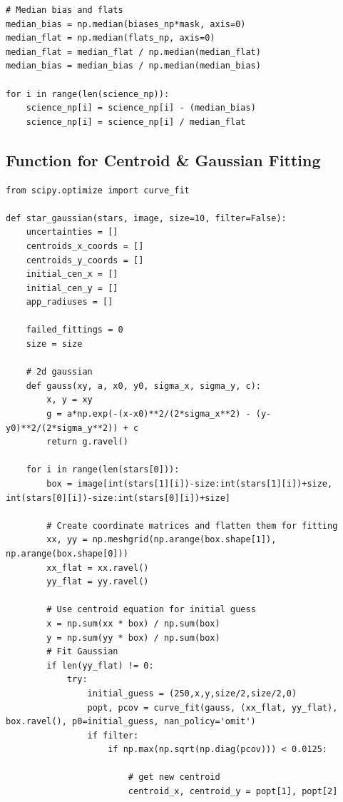 \documentclass{article}
\begin{document}
\begin{appendices}
\begin{scriptsize}
\begin{verbatim}
# Median bias and flats
median_bias = np.median(biases_np*mask, axis=0)
median_flat = np.median(flats_np, axis=0)
median_flat = median_flat / np.median(median_flat)
median_bias = median_bias / np.median(median_bias)

for i in range(len(science_np)):
    science_np[i] = science_np[i] - (median_bias)
    science_np[i] = science_np[i] / median_flat
\end{verbatim}
\end{scriptsize}


\subsection{Function for Centroid \& Gaussian Fitting}
\begin{scriptsize}
\begin{verbatim}
from scipy.optimize import curve_fit

def star_gaussian(stars, image, size=10, filter=False): 
    uncertainties = []   
    centroids_x_coords = []
    centroids_y_coords = []
    initial_cen_x = []
    initial_cen_y = []
    app_radiuses = []

    failed_fittings = 0
    size = size
    
    # 2d gaussian
    def gauss(xy, a, x0, y0, sigma_x, sigma_y, c):
        x, y = xy
        g = a*np.exp(-(x-x0)**2/(2*sigma_x**2) - (y-y0)**2/(2*sigma_y**2)) + c
        return g.ravel()

    for i in range(len(stars[0])):
        box = image[int(stars[1][i])-size:int(stars[1][i])+size, int(stars[0][i])-size:int(stars[0][i])+size]
        
        # Create coordinate matrices and flatten them for fitting
        xx, yy = np.meshgrid(np.arange(box.shape[1]), np.arange(box.shape[0])) 
        xx_flat = xx.ravel()
        yy_flat = yy.ravel()

        # Use centroid equation for initial guess
        x = np.sum(xx * box) / np.sum(box) 
        y = np.sum(yy * box) / np.sum(box) 
        # Fit Gaussian
        if len(yy_flat) != 0:            
            try:
                initial_guess = (250,x,y,size/2,size/2,0)
                popt, pcov = curve_fit(gauss, (xx_flat, yy_flat), box.ravel(), p0=initial_guess, nan_policy='omit')
                if filter:
                    if np.max(np.sqrt(np.diag(pcov))) < 0.0125:
                            
                        # get new centroid
                        centroid_x, centroid_y = popt[1], popt[2]
                        

\end{verbatim}
\end{scriptsize}
\end{appendices}
\end{document}
